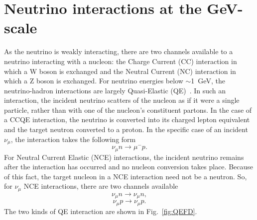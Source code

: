 \section{Neutrino interactions at the GeV-scale}
\label{sec:NeutrinoInteractionsGeVScale}
As the neutrino is weakly interacting, there are two channels available to a neutrino interacting with a nucleon: the Charge Current (CC) interaction in which a W boson is exchanged and the Neutral Current (NC) interaction in which a Z boson is exchanged.  For neutrino energies below $\sim$1~GeV, the neutrino-hadron interactions are largely Quasi-Elastic (QE)~\cite{RevModPhys.84.1307}.  In such an interaction, the incident neutrino scatters of the nucleon as if it were a single particle, rather than with one of the nucleon's constituent partons.  In the case of a CCQE interaction, the neutrino is converted into its charged lepton equivalent and the target neutron converted to a proton.  In the specific case of an incident $\nu_\mu$, the interaction takes the following form
\begin{equation}
\nu_\mu n \rightarrow \mu^- p.
\label{eq:CCQEInteraction}
\end{equation}
For Neutral Current Elastic (NCE) interactions, the incident neutrino remains after the interaction has occurred and no nucleon conversion takes place.  Because of this fact, the target nucleon in a NCE interaction need not be a neutron.  So, for $\nu_\mu$ NCE interactions, there are two channels available
\begin{equation}
\nu_\mu n \rightarrow \nu_\mu n,
\label{eq:NCEInteractionNeutronTarget}
\end{equation}
\begin{equation}
\nu_\mu p \rightarrow \nu_\mu p.
\label{eq:NCEInteractionProtonTarget}
\end{equation}
The two kinds of QE interaction are shown in Fig.~\ref{fig:QEFD}.
